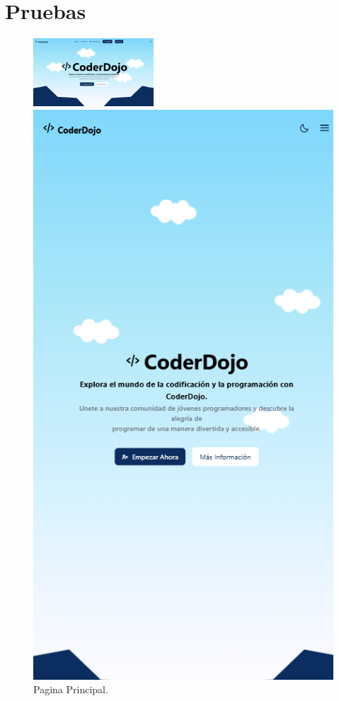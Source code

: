 \documentclass{article}
\begin{document}
\section{Pruebas}
\begin{figure}[H]
	\centering
	\includegraphics[width=0.4\textwidth,keepaspectratio]{img/home.png}
	\caption{Pagina Principal.}
	\centering
	\begin{minipage}{0.45\textwidth}
		\centering
		\includegraphics[width=\textwidth,keepaspectratio]{img/homeResponsive.png}

\end{minipage}
\end{figure}
\end{document}
